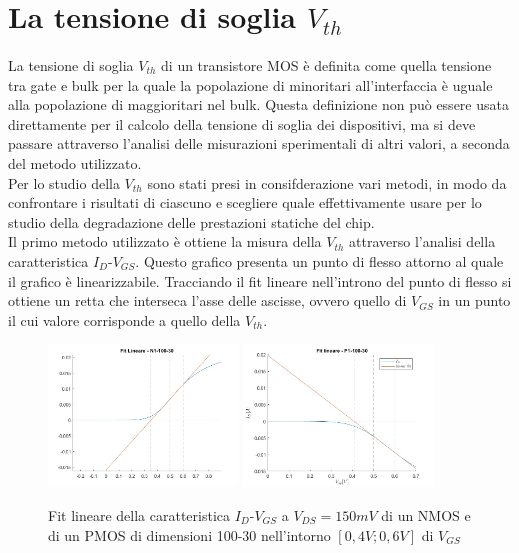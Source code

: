 \documentclass[12pt, letterpaper]{book}
\begin{document}
\section{La tensione di soglia $V_{th}$}

\paragraph{}
La tensione di soglia $V_{th}$ di un transistore MOS è definita come quella tensione tra gate e bulk per la quale la popolazione di minoritari all’interfaccia è uguale alla popolazione di maggioritari nel bulk. Questa definizione non può essere usata direttamente per il calcolo della tensione di soglia dei dispositivi, ma si deve passare attraverso l'analisi delle misurazioni sperimentali di altri valori, a seconda del metodo utilizzato. \\	
Per lo studio della $V_{th}$ sono stati presi in consifderazione vari metodi, in modo da confrontare i risultati di ciascuno e scegliere quale effettivamente usare per lo studio della degradazione delle prestazioni statiche del chip.\\
Il primo metodo utilizzato è  ottiene la misura della $V_{th}$ attraverso l'analisi della caratteristica $I_D$-$V_{GS}$. Questo grafico presenta un punto di flesso attorno al quale il grafico è linearizzabile. Tracciando il fit lineare nell'introno del punto di flesso si ottiene un retta che interseca l'asse delle ascisse, ovvero quello di $V_{GS}$ in un punto il cui valore corrisponde a quello della $V_{th}$.\\


\begin{figure}[h]
\centering
 \includegraphics[width=0.45\textwidth]{LinearFit-N1-100-30}
 \includegraphics[width=0.45\textwidth]{LinearFit-P1-100-30}
 \caption{Fit lineare della caratteristica  $I_D$-$V_{GS}$ a $V_{DS}=150mV$ di un NMOS e di un PMOS di dimensioni 100-30 nell'intorno $[0,4V ; 0,6V]$ di $V_{GS}$}
\label{fig:scimmia}
\end{figure}
\end{document}
